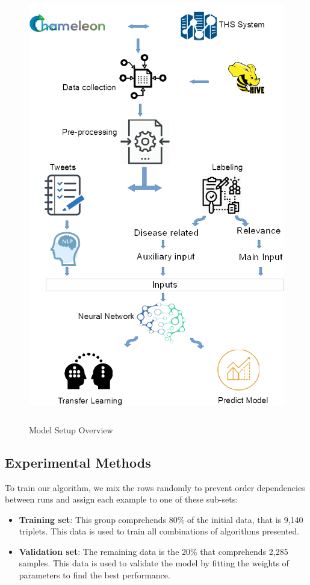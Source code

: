 \documentclass[12pt]{report}
\begin{document}
\begin{figure}[H]	
	\centering
	\includegraphics[height=190mm,  scale = 0.8]{images/10_architecture_setup.png}	
	\caption{Model Setup Overview}	
	\label{figure:model_setup}
\end{figure}

\subsection{Experimental Methods} \label{experimental_methods}

To train our algorithm, we mix the rows randomly to prevent order dependencies between runs and assign each example to one of these
sub-sets:

\begin{itemize}[nolistsep]
	\item \textbf{Training set}: This group comprehends 80\% of the initial data, that is 9,140 triplets. This data is used to train all combinations of algorithms presented.
	\item \textbf{Validation set}:  The remaining data is the 20\% that comprehends 2,285 samples. This data is used to validate the model by fitting the weights of parameters to find the best performance.
\end{itemize}
\end{document}
